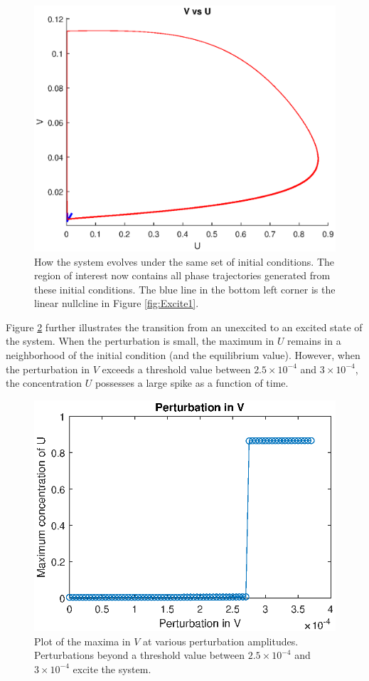 \documentclass[twocolumn,amsmath,amssymb,aps]{revtex4}
\begin{document}
\begin{figure}[!htb]
	\centering
	\includegraphics[scale=0.5]{excite_22.eps}
	\caption{How the system evolves under the same set of initial conditions. The region of interest now contains all phase trajectories generated from these initial conditions. The blue line in the bottom left corner is the linear nullcline in Figure \ref{fig:Excite1}.}
	\label{fig:Excite2}
\end{figure}

Figure \ref{fig:Excite3} further illustrates the transition from an unexcited to an excited state of the system. When the perturbation is small, the maximum in $U$ remains in a neighborhood of the initial condition (and the equilibrium value). However, when the perturbation in $V$ exceeds a threshold value between $2.5 \times 10^{-4}$ and $3 \times 10^{-4}$, the concentration $U$ possesses a large spike as a function of time. 


\begin{figure}[!htb]
	\centering
	\includegraphics[scale=0.6]{excite_2.eps}
	\caption{Plot of the maxima in $V$ at various perturbation amplitudes. Perturbations beyond a threshold value between $2.5\times 10^{-4}$ and $3\times 10^{-4}$ excite the system.}
	\label{fig:Excite3}
\end{figure}
\end{document}
